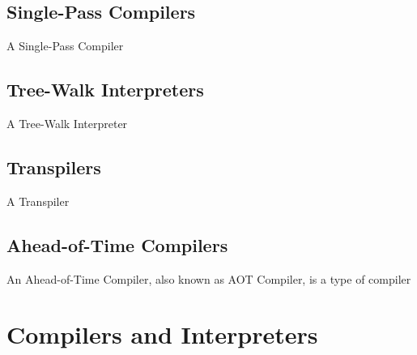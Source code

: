 \subsection{Single-Pass Compilers}
A Single-Pass Compiler
\subsection{Tree-Walk Interpreters}
A Tree-Walk Interpreter

\subsection{Transpilers}
A Transpiler

\subsection{Ahead-of-Time Compilers}
An Ahead-of-Time Compiler, also known as AOT Compiler, is a type of compiler

\section{Compilers and Interpreters}

